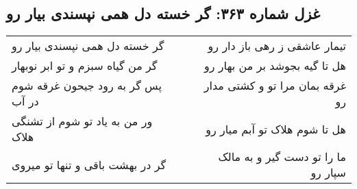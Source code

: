 \begin{center}
\section*{غزل شماره ۳۶۳: گر خسته دل همی نپسندی بیار رو}
\label{sec:363}
\begin{longtable}{l p{0.5cm} r}
گر خسته دل همی نپسندی بیار رو
&&
تیمار عاشقی ز رهی باز دار رو
\\
گر من گیاه سبزم و تو ابر نوبهار
&&
هل تا گیه بجوشد بر من بهار رو
\\
پس گر به رود جیحون غرقه شوم در آب
&&
غرقه بمان مرا تو و کشتی مدار رو
\\
ور من به یاد تو شوم از تشنگی هلاک
&&
هل تا شوم هلاک تو آبم میار رو
\\
گر در بهشت باقی و تنها تو میروی
&&
ما را تو دست گیر و به مالک سپار رو
\\
\end{longtable}
\end{center}
